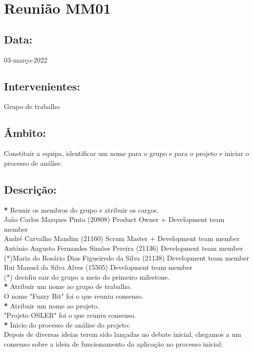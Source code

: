 
\section{Reunião MM01}\label{reuniaoMM01}

\subsection*{Data:}
03-março-2022

\subsection*{Intervenientes:}
Grupo de trabalho

\subsection*{Âmbito:}
Constituir a equipa, identificar um nome para o grupo e para o projeto e iniciar o processo de análise. \\

\subsection*{Descrição:}
\textbf{*} Reunir os membros do grupo e atribuir os cargos. \\
João Carlos Marques Pinto (20808) Product Owner + Development team member\\
André Carvalho Mandim (21160) Scrum Master + Development team member\\
António Augusto Fernandes Simões Pereira (21136) Development team member \\
(*)Maria do Rosário Dias Figueiredo da Silva (21138) Development team member \\
Rui Manuel da Silva Alves (15505) Development team member \\
\noindent (*) decidiu sair do grupo a meio do primeiro milestone. \\

\textbf{*} Atribuir um nome ao grupo de trabalho. \\
O nome "Fuzzy Bit" foi o que reuniu consenso. \\

\textbf{*} Atribuir um nome ao projeto. \\
"Projeto OSLER" foi o que reuniu consenso. \\

\textbf{*} Inicio do processo de análise do projeto: \\
Depois de diversas ideias terem sido lançadas no debate inicial, chegamos a um consenso sobre a ideia de funcionamento da aplicação no processo inicial:

